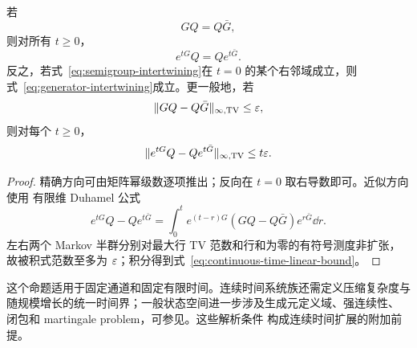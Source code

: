 \begin{proposition}
\label{prop:continuous-time-fixed-factor}
若
\begin{equation}
GQ=Q\bar G,
\label{eq:generator-intertwining}
\end{equation}
则对所有 $t\ge0$，
\begin{equation}
e^{tG}Q=Qe^{t\bar G}.
\label{eq:semigroup-intertwining}
\end{equation}
反之，若式~\eqref{eq:semigroup-intertwining}在 $t=0$ 的某个右邻域成立，则
式~\eqref{eq:generator-intertwining}成立。更一般地，若
\[
\|GQ-Q\bar G\|_{\infty,\operatorname{TV}}\le\varepsilon,
\]
则对每个 $t\ge0$，
\begin{equation}
\|e^{tG}Q-Qe^{t\bar G}\|_{\infty,\operatorname{TV}}
\le t\varepsilon.
\label{eq:continuous-time-linear-bound}
\end{equation}
\end{proposition}

\begin{proof}
精确方向可由矩阵幂级数逐项推出；反向在 $t=0$ 取右导数即可。近似方向使用
有限维 Duhamel 公式
\[
e^{tG}Q-Qe^{t\bar G}
=\int_0^t e^{(t-r)G}(GQ-Q\bar G)e^{r\bar G}\dd r.
\]
左右两个 Markov 半群分别对最大行 TV 范数和行和为零的有符号测度非扩张，
故被积式范数至多为 $\varepsilon$；积分得到式~\eqref{eq:continuous-time-linear-bound}。
\end{proof}

这个命题适用于固定通道和固定有限时间。连续时间系统族还需定义压缩复杂度与
随规模增长的统一时间界；一般状态空间进一步涉及生成元定义域、强连续性、
闭包和 martingale problem，可参见\citet{EthierKurtz1986}。这些解析条件
构成连续时间扩展的附加前提。
